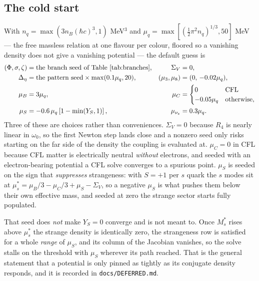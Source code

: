 \documentclass[11pt,a4paper]{article}
\newcommand{\Mstar}{M^{*}}
\newcommand{\mustar}{\mu^{*}}
\newcommand{\code}[1]{\texttt{#1}}
\begin{document}
\subsection{The cold start}
\label{sec:guess}

With $n_q = \max(3n_B (\hbar c)^3, 1)$ MeV$^3$ and
$\mu_q=\max\!\left[(\tfrac12\pi^2 n_q)^{1/3},50\right]$ MeV --- the free
massless relation at one flavour per colour, floored so a vanishing density
does not give a vanishing potential --- the default guess is
\begin{equation}
\begin{aligned}
(\Phi,\sigma,\zeta) &= \text{the branch seed of Table~\ref{tab:branches}}, &
\Sigma_V &= 0, \\
\Delta_\eta &= \text{the pattern seed} \times \max(0.1\mu_q,20), &
(\mu_3,\mu_8) &= (0,\,-0.02\mu_q), \\
\mu_B &= 3\mu_q, &
\mu_C &= \begin{cases}0 & \text{CFL}\\ -0.05\mu_q & \text{otherwise,}\end{cases}\\
\mu_S &= -0.6\,\mu_q\left[1-\min(Y_S,1)\right], &
\mu_{\nu_e} &= 0.3\mu_q .
\end{aligned}
\end{equation}
Three of these are choices rather than conveniences. $\Sigma_V=0$ because
$R_4$ is nearly linear in $\omega_0$, so the first Newton step lands close and
a nonzero seed only risks starting on the far side of the density the coupling
is evaluated at. $\mu_C=0$ in CFL because CFL matter is electrically neutral
\emph{without} electrons, and seeded with an electron-bearing potential a CFL
solve converges to a spurious point. $\mu_S$ is seeded on the sign that
\emph{suppresses} strangeness: with $S=+1$ per $s$ quark the $s$ modes sit at
$\mustar_s = \mu_B/3-\mu_C/3+\mu_S-\Sigma_V$, so a negative $\mu_S$ is what
pushes them below their own effective mass, and seeded at zero the strange
sector starts fully populated.

That seed does \emph{not} make $Y_S=0$ converge and is not meant to. Once
$\Mstar_s$ rises above $\mustar_s$ the strange density is identically zero, the
strangeness row is satisfied for a whole \emph{range} of $\mu_S$, and its
column of the Jacobian vanishes, so the solve stalls on the threshold with
$\mu_S$ wherever its path reached. That is the general statement that a
potential is only pinned as tightly as its conjugate density responds, and it
is recorded in \code{docs/DEFERRED.md}.
\end{document}

